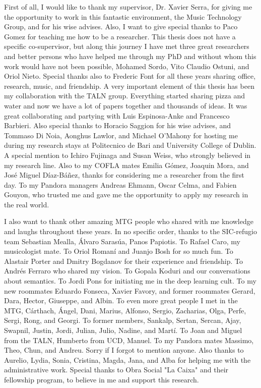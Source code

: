 First of all, I would like to thank my supervisor, Dr. Xavier Serra, for giving me the opportunity to work in this fantastic environment, the Music Technology Group, and for his wise advises. Also, I want to give special thanks to Paco Gomez for teaching me how to be a researcher. This thesis does not have a specific co-supervisor, but along this journey I have met three great researchers and better persons who have helped me through my PhD and without whom this work would have not been possible, Mohamed Sordo, Vito Claudio Ostuni, and Oriol Nieto. 
Special thanks also to Frederic Font for all these years sharing office, research, music, and friendship.
A very important element of this thesis has been my collaboration with the TALN group. Everything started sharing pizza and water and now we have a lot of papers together and thousands of ideas. It was great collaborating and partying with Luis Espinosa-Anke and Francesco Barbieri. Also special thanks to Horacio Saggion for his wise advises, and Tommaso Di Noia, Aonghus Lawlor, and Michael O'Mahony for hosting me during my research stays at Politecnico de Bari and University College of Dublin. 
A special mention to Ichiro Fujinaga and Susan Weiss, who strongly believed in my research line. Also to my COFLA mates Emilia Gómez, Joaquin Mora, and José Miguel Díaz-Báñez, thanks for considering me a researcher from the first day.
To my Pandora managers Andreas Ehmann, Oscar Celma, and Fabien Gouyon, who trusted me and gave me the opportunity to apply my research in the real world.

I also want to thank other amazing MTG people who shared with me knowledge and laughs throughout these years. In no specific order, thanks to the SIC-refugio team
Sebastian Mealla, Álvaro Sarasúa, Panos Papiotis. To Rafael Caro, my musicologist mate. To Oriol Romaní and Juanjo Bosh for so much fun. To Alastair Porter and Dmitry Bogdanov for their experience and friendship. To Andrés Ferraro who shared my vision. To Gopala Koduri and our conversations about semantics. To Jordi Pons for initiating me in the deep learning cult. To my new roommates Eduardo Fonseca, Xavier Favory, and former roommates Gerard, Dara, Hector, Giuseppe, and Albin. To even more great people I met in the MTG, Cárthach, Ángel, Dani, Marius, Alfonso, Sergio, Zacharias, Olga, Perfe, Sergi, Rong, and Georgi. To former members, Sankalp, Sertan, Sercan, Ajay, Swapnil, Justin, Jordi, Julian, Julio, Nadine, and Martí. To Joan and Miguel from the TALN, Humberto from UCD, Manuel. To my Pandora mates Massimo, Theo, Chun, and Andreu. Sorry if I forgot to mention anyone.
Also thanks to Aurelio, Lydia, Sonia, Cristina, Magda, Jana, and Alba for helping me with the administrative work.
Special thanks to Obra Social "La Caixa" and their fellowship program, to believe in me and support this research.

